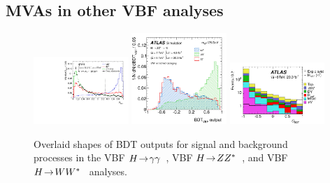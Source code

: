 \subsection{MVAs in other VBF analyses}
\label{sec:strategy-mva-elsewhere}

\begin{figure}[tp]
  \centering
  \includegraphics[width=0.32\textwidth]{figures/HIGG-2013-08/fig_06}
  \includegraphics[width=0.32\textwidth]{figures/HIGG-2013-21/fig_09f}
  \includegraphics[width=0.32\textwidth]{figures/HIGG-2013-13/fig_46a}
  \caption{Overlaid shapes of BDT outputs for signal and background processes in the VBF $H \!\rightarrow\! \gamma\gamma$~\cite{HIGG-2013-08}, VBF $H \!\rightarrow\! ZZ^\ast$~\cite{HIGG-2013-21}, and VBF $H \!\rightarrow\! WW^\ast$~\cite{HIGG-2013-13} analyses.}
  \label{fig:strategy-elsewhere}
\end{figure}



